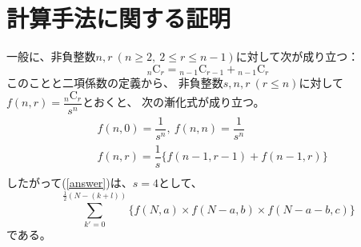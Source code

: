 \documentclass{article}
\begin{document}
\section{計算手法に関する証明}

一般に、非負整数$n, r\ (n \geq 2,\ 2 \leq r \leq n - 1)$に対して次が成り立つ：
\begin{equation*}
    {}_n \mathrm{C}_r = {}_{n-1} \mathrm{C}_{r-1} + {}_{n-1} \mathrm{C}_{r}
\end{equation*}
このことと二項係数の定義から、
非負整数$s, n, r\ (r \leq n)$に対して$f(n, r) = \dfrac{{}_n \mathrm{C}_r}{s^n}$とおくと、
次の漸化式が成り立つ。
\begin{eqnarray*}
    &f(n, 0) = \dfrac{1}{s^n},\ f(n, n) = \dfrac{1}{s^n} \\
    &f(n, r) = \dfrac{1}{s} \{f(n-1, r-1) + f(n-1, r)\} \\
\end{eqnarray*}
したがって(\ref{answer})は、$s = 4$として、
\begin{equation*}
    \sum_{k' = 0}^{ \frac{1}{2} (N - (k + l)) }
    \{ f(N, a) \times f(N-a, b) \times f(N-a-b, c) \}
\end{equation*}
である。
\end{document}
